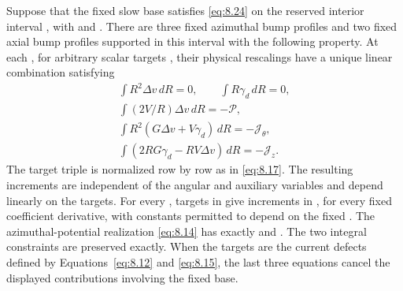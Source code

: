 \begin{lemma}\label{lem:8.7}
Suppose that the fixed slow base satisfies \eqref{eq:8.24} on the reserved interior interval
, with  and
. There are three fixed azimuthal bump profiles and two
fixed axial bump profiles supported in this interval with the following property. At each
, for arbitrary scalar targets
, their physical rescalings have a
unique linear combination  satisfying
\begin{equation}
\begin{gathered}
\int R^2\Delta v\,dR=0,\qquad \int R\gamma_d\,dR=0,\\
\int (2V/R)\Delta v\,dR=-\mathcal P,\\
\int R^2(G\Delta v+V\gamma_d)\,dR=-\mathcal J_\theta,\\
\int (2RG\gamma_d-RV\Delta v)\,dR=-\mathcal J_z.
\end{gathered}
\tag{8.25}\label{eq:8.25}
\end{equation}
The target triple is normalized row by row as in \eqref{eq:8.17}. The resulting increments are
independent of the angular and auxiliary variables and depend linearly on the targets. For every
, targets in  give increments in
, for every fixed coefficient derivative, with constants permitted to
depend on the fixed . The azimuthal-potential realization
\eqref{eq:8.14} has  exactly and
. The two integral constraints are preserved
exactly. When the targets are the current defects defined by Equations~\eqref{eq:8.12} and
\eqref{eq:8.15}, the last three equations cancel the displayed contributions involving the fixed
base.
\end{lemma}

